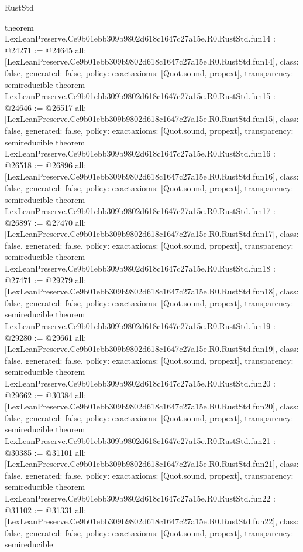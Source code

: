 \begin{lexlean}{RustStd}
\begin{coremodule}
{}
theorem LexLeanPreserve.Ce9b01ebb309b9802d618c1647c27a15e.R0.RustStd.fun14 : @24271 := @24645 {
  all: [LexLeanPreserve.Ce9b01ebb309b9802d618c1647c27a15e.R0.RustStd.fun14],
  class: false,
  generated: false,
  policy: exact{axioms: [Quot.sound, propext]},
  transparency: semireducible
}
theorem LexLeanPreserve.Ce9b01ebb309b9802d618c1647c27a15e.R0.RustStd.fun15 : @24646 := @26517 {
  all: [LexLeanPreserve.Ce9b01ebb309b9802d618c1647c27a15e.R0.RustStd.fun15],
  class: false,
  generated: false,
  policy: exact{axioms: [Quot.sound, propext]},
  transparency: semireducible
}
theorem LexLeanPreserve.Ce9b01ebb309b9802d618c1647c27a15e.R0.RustStd.fun16 : @26518 := @26896 {
  all: [LexLeanPreserve.Ce9b01ebb309b9802d618c1647c27a15e.R0.RustStd.fun16],
  class: false,
  generated: false,
  policy: exact{axioms: [Quot.sound, propext]},
  transparency: semireducible
}
theorem LexLeanPreserve.Ce9b01ebb309b9802d618c1647c27a15e.R0.RustStd.fun17 : @26897 := @27470 {
  all: [LexLeanPreserve.Ce9b01ebb309b9802d618c1647c27a15e.R0.RustStd.fun17],
  class: false,
  generated: false,
  policy: exact{axioms: [Quot.sound, propext]},
  transparency: semireducible
}
theorem LexLeanPreserve.Ce9b01ebb309b9802d618c1647c27a15e.R0.RustStd.fun18 : @27471 := @29279 {
  all: [LexLeanPreserve.Ce9b01ebb309b9802d618c1647c27a15e.R0.RustStd.fun18],
  class: false,
  generated: false,
  policy: exact{axioms: [Quot.sound, propext]},
  transparency: semireducible
}
theorem LexLeanPreserve.Ce9b01ebb309b9802d618c1647c27a15e.R0.RustStd.fun19 : @29280 := @29661 {
  all: [LexLeanPreserve.Ce9b01ebb309b9802d618c1647c27a15e.R0.RustStd.fun19],
  class: false,
  generated: false,
  policy: exact{axioms: [Quot.sound, propext]},
  transparency: semireducible
}
theorem LexLeanPreserve.Ce9b01ebb309b9802d618c1647c27a15e.R0.RustStd.fun20 : @29662 := @30384 {
  all: [LexLeanPreserve.Ce9b01ebb309b9802d618c1647c27a15e.R0.RustStd.fun20],
  class: false,
  generated: false,
  policy: exact{axioms: [Quot.sound, propext]},
  transparency: semireducible
}
theorem LexLeanPreserve.Ce9b01ebb309b9802d618c1647c27a15e.R0.RustStd.fun21 : @30385 := @31101 {
  all: [LexLeanPreserve.Ce9b01ebb309b9802d618c1647c27a15e.R0.RustStd.fun21],
  class: false,
  generated: false,
  policy: exact{axioms: [Quot.sound, propext]},
  transparency: semireducible
}
theorem LexLeanPreserve.Ce9b01ebb309b9802d618c1647c27a15e.R0.RustStd.fun22 : @31102 := @31331 {
  all: [LexLeanPreserve.Ce9b01ebb309b9802d618c1647c27a15e.R0.RustStd.fun22],
  class: false,
  generated: false,
  policy: exact{axioms: [Quot.sound, propext]},
  transparency: semireducible
}
\end{coremodule}
\end{lexlean}
